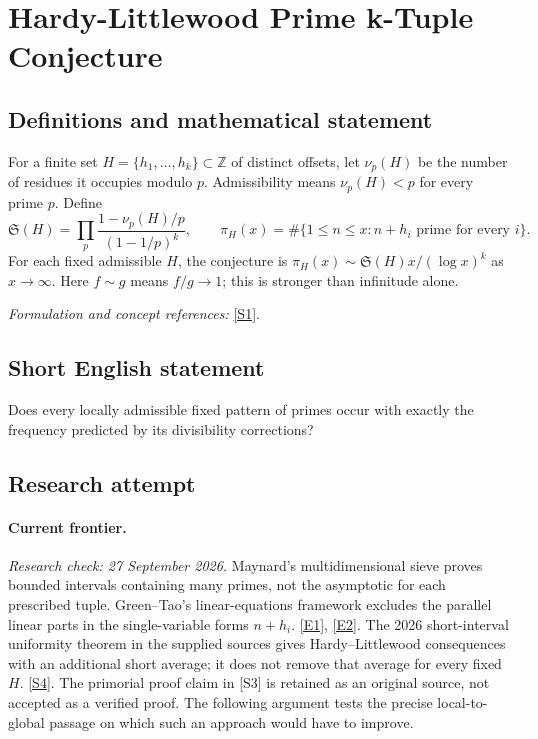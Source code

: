 \documentclass[11pt,a4paper]{article}
\newcommand{\Z}{\mathbb{Z}}
\newcommand{\sref}[2]{\hyperlink{source:#1:#2}{[S#2]}}
\newcommand{\eref}[2]{\hyperlink{extra:#1:#2}{[E#2]}}
\newif\ifshowcatalogue
\newcommand{\cataloguescope}[1]{\ifshowcatalogue
 \paragraph{Exact scope in the supplied catalogue.}
 \begin{quote}\small #1\end{quote}\fi}
\begin{document}
\setcounter{section}{0}
\clearpage
\section*{\texorpdfstring{Hardy-Littlewood Prime k-Tuple Conjecture}{Hardy-Littlewood Prime k-Tuple Conjecture}}\label{statement}
\subsection{Definitions and mathematical statement}
For a finite set $H=\{h_1,\ldots,h_k\}\subset\Z$ of distinct offsets, let $\nu_p(H)$ be the number of residues it occupies modulo $p$. Admissibility means $\nu_p(H)<p$ for every prime $p$. Define
\[
 \mathfrak S(H)=\prod_p\frac{1-\nu_p(H)/p}{(1-1/p)^k},\qquad
 \pi_H(x)=\#\{1\le n\le x:n+h_i\text{ prime for every }i\}.
\]
For each fixed admissible $H$, the conjecture is $\pi_H(x)\sim\mathfrak S(H)x/(\log x)^k$ as $x\to\infty$. Here $f\sim g$ means $f/g\to1$; this is stronger than infinitude alone.
\par\smallskip\textit{Formulation and concept references:} \sref{statement}{1}.
\cataloguescope{For every finite admissible set H=\{h\_1,...,h\_k\} of distinct integers, prove that the number of n <= x for which every n+h\_i is prime is asymptotic to S(H)x/(log x)\textasciicircum{}k, where S(H) is the Hardy-Littlewood singular series, or disprove this formula.}
\subsection{Short English statement}
Does every locally admissible fixed pattern of primes occur with exactly the frequency predicted by its divisibility corrections?
\subsection{Research attempt}
\paragraph{Current frontier.}
\textit{Research check: 27 September 2026.}
Maynard's multidimensional sieve proves bounded intervals containing many
primes, not the asymptotic for each prescribed tuple. Green--Tao's
linear-equations framework excludes the parallel linear parts in the
single-variable forms $n+h_i$. \eref{statement}{1}, \eref{statement}{2}.
The 2026 short-interval uniformity theorem in the supplied sources gives
Hardy--Littlewood consequences with an additional short average; it does
not remove that average for every fixed $H$. \sref{statement}{4}.
The primorial proof claim in [S3] is retained as an original source, not
accepted as a verified proof. The following argument tests the precise
local-to-global passage on which such an approach would have to improve.
\end{document}
